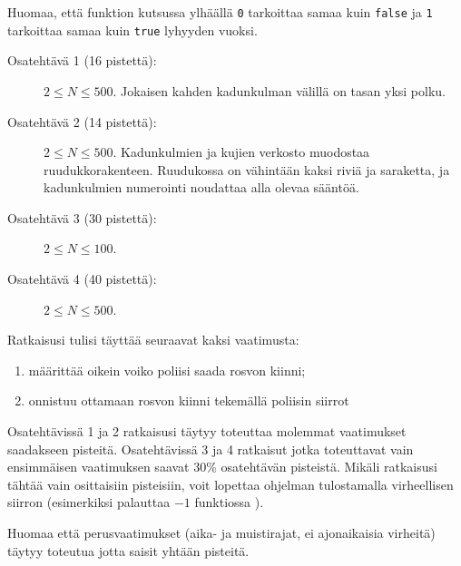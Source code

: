 \documentclass{boi2014-fi}
\newcommand{\constant}[1]{{\tt #1}}
\begin{document}
    Huomaa, että funktion  kutsussa ylhäällä
    \constant{0} tarkoittaa samaa kuin \constant{false} ja
    \constant{1} tarkoittaa samaa kuin \constant{true} lyhyyden vuoksi.

    \Scoring
    \begin{description}
        \item[Osatehtävä 1 (16 pistettä):] $2 \le N \le 500$.
        Jokaisen kahden kadunkulman välillä on tasan yksi polku.        
        \item[Osatehtävä 2 (14 pistettä):] $2 \le N \le 500$. Kadunkulmien ja
        kujien verkosto muodostaa ruudukkorakenteen. Ruudukossa on vähintään
        kaksi riviä ja saraketta, ja kadunkulmien numerointi noudattaa
        alla olevaa sääntöä.
        \begin{figure}[h!]
           \centering
        \end{figure}
        \item[Osatehtävä 3 (30 pistettä):] $2 \le N \le 100$.
        \item[Osatehtävä 4 (40 pistettä):] $2 \le N \le 500$.
    \end{description}

    Ratkaisusi tulisi täyttää seuraavat kaksi vaatimusta:
    \begin{enumerate}
        \item määrittää oikein voiko poliisi saada rosvon kiinni;
        \item onnistuu ottamaan rosvon kiinni tekemällä poliisin siirrot
    \end{enumerate}
    
    Osatehtävissä 1 ja 2 ratkaisusi täytyy toteuttaa molemmat vaatimukset
    saadakseen pisteitä.
    Osatehtävissä 3 ja 4 ratkaisut jotka toteuttavat vain ensimmäisen vaatimuksen
    saavat 30\% osatehtävän pisteistä. 
    Mikäli ratkaisusi tähtää vain osittaisiin pisteisiin, voit lopettaa
    ohjelman tulostamalla virheellisen siirron (esimerkiksi palauttaa $-1$
    funktiossa ).
    
    Huomaa että perusvaatimukset (aika- ja muistirajat, ei ajonaikaisia virheitä)
    täytyy toteutua jotta saisit yhtään pisteitä.
    
\end{document}
